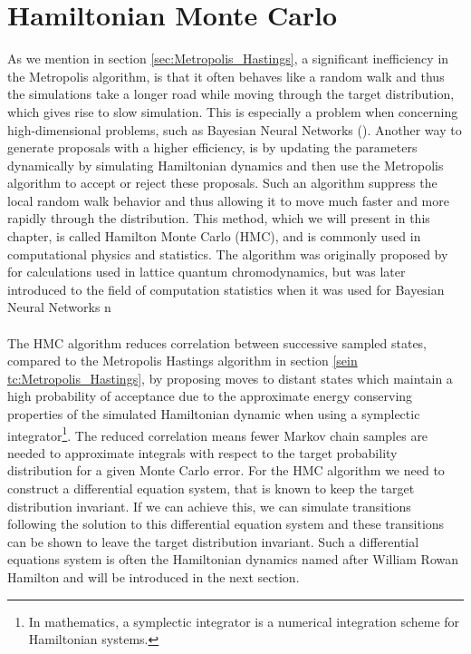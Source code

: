 \section{Hamiltonian Monte Carlo}
As we mention in section \ref{sec:Metropolis_Hastings}, a significant inefficiency in the Metropolis algorithm, is that it often behaves like a random walk and thus the simulations take a longer road while moving through the target distribution, which gives rise to slow simulation. This is especially a problem when concerning high-dimensional problems, such as Bayesian Neural Networks (\cite{neal2012bayesian}).
Another way to generate proposals with a higher efficiency, is by updating the parameters dynamically by simulating Hamiltonian dynamics and then use the Metropolis algorithm to accept or reject these proposals. Such an algorithm suppress the local random walk behavior and thus allowing it to move much faster and more rapidly through the distribution. This method, which we will present in this chapter, is called Hamilton Monte Carlo (HMC), and is commonly used in computational physics and statistics. The algorithm was originally proposed by \cite{Duane1987216} for calculations used in lattice quantum chromodynamics, but was later introduced to the field of computation statistics when it was used for Bayesian Neural Networks n \cite{neal2012bayesian}\\
\\
The HMC algorithm reduces correlation between successive sampled states, compared to the Metropolis Hastings algorithm in section \ref{sein tc:Metropolis_Hastings}, by proposing moves to distant states which maintain a high probability of acceptance due to the approximate energy conserving properties of the simulated Hamiltonian dynamic when using a symplectic integrator\footnote{In mathematics, a symplectic integrator is a numerical integration scheme for Hamiltonian systems.}. The reduced correlation means fewer Markov chain samples are needed to approximate integrals with respect to the target probability distribution for a given Monte Carlo error. For the HMC algorithm we need to construct a differential equation system, that is known to keep the target distribution invariant. If we can achieve this, we can simulate transitions following the solution to this differential equation system and these transitions can be shown to leave the target distribution invariant. Such a differential equations system is often the Hamiltonian dynamics named after William Rowan Hamilton and will be introduced in the next section. 

